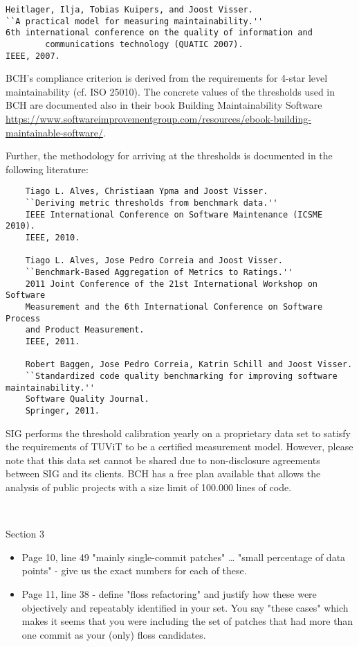 \documentclass[11pt,fleqn]{article}
\newcommand{\eline}{\vspace*{.75\baselineskip}}
\newcommand{\Referee}[1]{\eline \noindent {\bf Reviewer comment #1:} \\}
\newenvironment{revcomment}[1][]
{\Referee{#1}\begin{rcomment}}
{\end{rcomment}}
\begin{document}
\begin{verbatim}
Heitlager, Ilja, Tobias Kuipers, and Joost Visser. 
``A practical model for measuring maintainability.'' 
6th international conference on the quality of information and 
        communications technology (QUATIC 2007). 
IEEE, 2007.
\end{verbatim}

BCH's compliance criterion is derived from the requirements for 4-star level maintainability (cf. ISO 25010). 
The concrete values of the thresholds used in BCH are documented also in their book Building Maintainability 
Software \url{https://www.softwareimprovementgroup.com/resources/ebook-building-maintainable-software/}.

Further, the methodology for arriving at the thresholds is documented in the following 
literature:

\begin{verbatim}
    Tiago L. Alves, Christiaan Ypma and Joost Visser. 
    ``Deriving metric thresholds from benchmark data.'' 
    IEEE International Conference on Software Maintenance (ICSME 2010). 
    IEEE, 2010.

    Tiago L. Alves, Jose Pedro Correia and Joost Visser. 
    ``Benchmark-Based Aggregation of Metrics to Ratings.'' 
    2011 Joint Conference of the 21st International Workshop on Software 
    Measurement and the 6th International Conference on Software Process 
    and Product Measurement. 
    IEEE, 2011.

    Robert Baggen, Jose Pedro Correia, Katrin Schill and Joost Visser. 
    ``Standardized code quality benchmarking for improving software maintainability.'' 
    Software Quality Journal.
    Springer, 2011.

\end{verbatim}

SIG performs the threshold calibration
yearly on a proprietary data set to satisfy the requirements of TUViT to
be a certified measurement model. However, please note that this data set 
cannot be shared due to non-disclosure agreements between SIG and its 
clients. BCH has a free plan available that allows the analysis of public
projects with a size limit of 100.000 lines of code.


\begin{revcomment}[2.13]
    Section 3\\
    \begin{itemize}
        \item Page 10, line 49 "mainly single-commit patches" … "small percentage 
        of data points" - give us the exact numbers for each of these.  
        \item Page 11, line 38 - define "floss refactoring" and justify how these were objectively 
        and repeatably identified in your set. You say "these cases" which makes 
        it seems that you were including the set of patches that had more than one 
        commit as your (only) floss candidates.  
    \end{itemize}
\end{revcomment}
\end{document}
